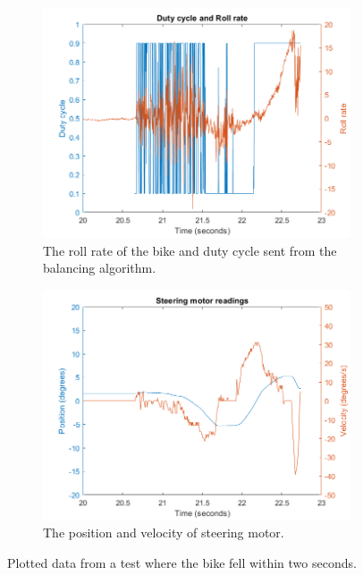\begin{figure}[H]
    \begin{subfigure}{.5\textwidth}
        \centering
        \includegraphics[width=\textwidth]{figure/test6_control.png}
        \caption{The roll rate of the bike and duty cycle sent from the balancing algorithm.}
        \label{fig:test6_control}
    \end{subfigure}
    \begin{subfigure}{.5\textwidth}
        \centering
        \includegraphics[width=\textwidth]{figure/test6_motor.png}
        \caption{The position and velocity of steering motor.}
        \label{fig:test6_motor}
    \end{subfigure}
\caption{Plotted data from a test where the bike fell within two seconds.}
\label{fig:test6}
\end{figure}

